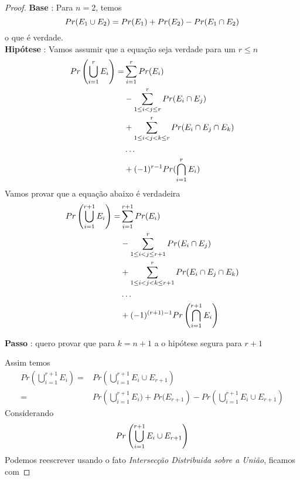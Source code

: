 \documentclass{article}
\begin{document}
\begin{proof}
    \hfill \break
    \textbf{Base} : Para $n = 2$, temos
    \begin{equation}
    \notag
        Pr(E_1 \cup E_2) = Pr(E_1) + Pr(E_2)- Pr(E_1 \cap E_2)
    \end{equation}
    \hspace*{30pt} o que é verdade.\\

    \textbf{Hipótese} : Vamos assumir que a equação seja verdade para um $r \leq n$
    \begin{equation}
    \notag
        \begin{split}
            Pr\left(\bigcup_{i = 1}^{r}E_i\right) =& \sum\limits_{i=1}^{r}Pr(E_i)\\
            & -\sum\limits_{1\leq i<j\leq r}^{r}Pr(E_i \cap E_j)\\
            & +\sum\limits_{1\leq i<j<k\leq r}^{r}Pr(E_i \cap E_j \cap E_k)\\
            & \ldots\\
            & +(-1)^{r-1}Pr(\bigcap_{i=1}^{r}E_i)
        \end{split}
    \end{equation}
    Vamos provar que a equação abaixo é verdadeira
    \begin{equation}
    \notag
        \begin{split}
            Pr\left(\bigcup_{i = 1}^{r+1}E_i\right) =& \sum\limits_{i=1}^{r+1}Pr(E_i)\\
            & -\sum\limits_{1\leq i<j\leq r+1}^{r}Pr(E_i \cap E_j)\\
            & +\sum\limits_{1\leq i<j<k\leq r+1}^{r}Pr(E_i \cap E_j \cap E_k)\\
            & \ldots\\
            & +(-1)^{(r+1)-1}Pr\left(\bigcap_{i=1}^{r+1}E_i\right)
        \end{split}
    \end{equation}

    \textbf{Passo} : quero provar que para $k = n + 1$ a o hipótese segura para $r + 1$

    \hspace*{30pt} Assim temos \newline
    \begin{equation}
    \label{eq:dev}
        \begin{split}
            Pr\left(\bigcup_{i = 1}^{r+1}E_i\right) =& Pr\left(\bigcup_{i = 1}^{r+1}E_i \cup E_{r+1}\right)\\
            =& Pr\left(\bigcup_{i = 1}^{r+1}E_i) + Pr(E_{r+1}\right) - Pr\left(\bigcup_{i = 1}^{r+1}E_i \cup E_{r+1}\right)
        \end{split}
    \end{equation}
    Considerando 
    \begin{equation}
        \notag
        Pr\left(\bigcup_{i = 1}^{r+1}E_i \cup E_{r+1}\right)
    \end{equation}
    Podemos reescrever usando o fato \textit{Intersecção Distribuida sobre a União}, ficamos com


\end{proof}
\end{document}
